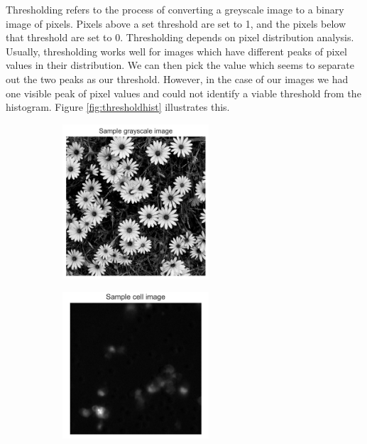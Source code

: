 Thresholding refers to the process of converting a greyscale image to a binary image of pixels. Pixels above a set threshold are set to 1, and the pixels below that threshold are set to 0. Thresholding depends on pixel distribution analysis. Usually, thresholding works well for images which have different peaks of pixel values in their distribution. We can then pick the value which seems to separate out the two peaks as our threshold. However, in the case of our images we had one visible peak of pixel values and could not identify a viable threshold from the histogram. Figure \ref{fig:thresholdhist} illustrates this.

\begin{figure}[h]
    \centering
    \begin{subfigure}{0.45\textwidth}
        \centering
        \includegraphics[width=0.6\textwidth]{dissertation/figures/sample_grayscale.jpg}
    \end{subfigure}
    \begin{subfigure}{0.45\textwidth}
        \centering
        \includegraphics[width=0.6\textwidth]{dissertation/figures/sample_cell.jpg}

\end{subfigure}
\end{figure}
